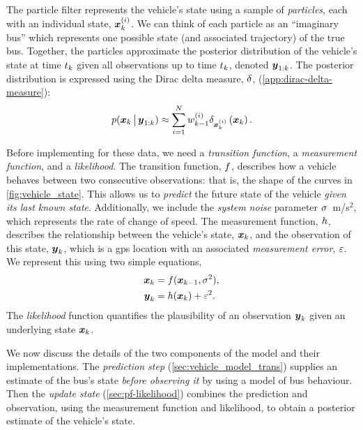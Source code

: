 The particle filter represents the vehicle's state using a sample of \emph{particles}, each with an individual state, $\boldsymbol x_k^{(i)}$. We can think of each particle as an ``imaginary bus'' which represents one possible state (and associated trajectory) of the true bus. Together, the particles approximate the posterior distribution of the vehicle's state at time $t_k$ given all observations up to time $t_k$, denoted $\boldsymbol{y}_{1:k}$. The posterior distribution is expressed using the Dirac delta measure, $\delta$, (\cref{app:dirac-delta-measure}):
\begin{equation}
\label{eq:vehicle_state_dirac}
p(\boldsymbol x_k \,\big|\,{} \boldsymbol{y}_{1:k}) \approx
\sum_{i=1}^N w^{(i)}_{k-1} \delta_{\boldsymbol x_k^{(i)}}\left(\boldsymbol x_k\right).
\end{equation}

Before implementing  for these data, we need a \emph{transition function}, a \emph{measurement function}, and a \emph{likelihood}. The transition function, $f$, describes how a vehicle behaves between two consecutive observations: that is, the shape of the curves in \cref{fig:vehicle_state}. This allows us to \emph{predict} the future state of the vehicle \emph{given its last known state}. Additionally, we include the \emph{system noise} parameter $\sigma$~m/s$^2$, which represents the rate of change of speed. The measurement function, $h$, describes the relationship between the vehicle's state, $\boldsymbol x_k$, and the observation of this state, $\boldsymbol{y}_k$, which is a \gls{gps} location with an associated \emph{measurement error}, $\varepsilon$. We represent this using two simple equations,
\begin{equation}
\label{eq:vehicle_model}
\begin{split}
\boldsymbol x_k &= f(\boldsymbol x_{k-1}, \sigma^2), \\
\boldsymbol{y}_k &= h(\boldsymbol x_k) + \varepsilon^2.
\end{split}
\end{equation}
The \emph{likelihood} function quantifies the plausibility of an observation $\boldsymbol{y}_k$ given an underlying state $\boldsymbol x_k$.


We now discuss the details of the two components of the model and their implementations. The \emph{prediction step} (\cref{sec:vehicle_model_trans}) supplies an estimate of the bus's state \emph{before observing it} by using a model of bus behaviour. Then the \emph{update state} (\cref{sec:pf-likelihood}) combines the prediction and observation, using the measurement function and likelihood, to obtain a posterior estimate of the vehicle's state.
